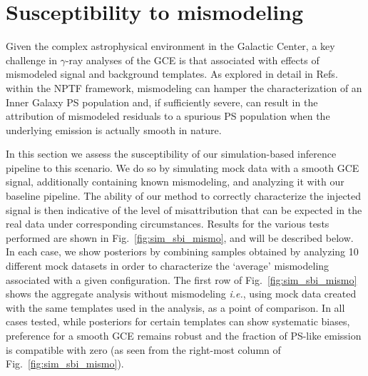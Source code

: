 \documentclass[prd,aps,10pt,nofootinbib,twocolumn,superscriptaddress,preprintnumbers,balancelastpage,longbibliography]{revtex4-1}
\begin{document}

\section{Susceptibility to mismodeling}
\label{sec:mismodeling}

Given the complex astrophysical environment in the Galactic Center, a key challenge in $\gamma$-ray analyses of the GCE is that associated with effects of mismodeled signal and background templates. As explored in detail in Refs.~\cite{Lee:2015fea,Leane:2020pfc,Leane:2020nmi,Buschmann:2020adf,Chang:2019ars} within the NPTF framework, mismodeling can hamper the characterization of an Inner Galaxy PS population and, if sufficiently severe, can result in the attribution of mismodeled residuals to a spurious PS population when the underlying emission is actually smooth in nature. 

In this section we assess the susceptibility of our simulation-based inference pipeline to this scenario. We do so by simulating mock data with a smooth GCE signal, additionally containing known mismodeling, and analyzing it with our baseline pipeline. The ability of our method to correctly characterize the injected signal is then indicative of the level of misattribution that can be expected in the real data under corresponding circumstances. Results for the various tests performed are shown in Fig.~\ref{fig:sim_sbi_mismo}, and will be described below. In each case, we show posteriors by combining samples obtained by analyzing 10 different mock datasets in order to characterize the `average' mismodeling associated with a given configuration. The first row of Fig.~\ref{fig:sim_sbi_mismo} shows the aggregate analysis without mismodeling \emph{i.e.}, using mock data created with the same templates used in the analysis, as a point of comparison. In all cases tested, while posteriors for certain templates can show systematic biases, preference for a smooth GCE remains robust and the fraction of PS-like emission is compatible with zero (as seen from the right-most column of Fig.~\ref{fig:sim_sbi_mismo}). \\
\end{document}
